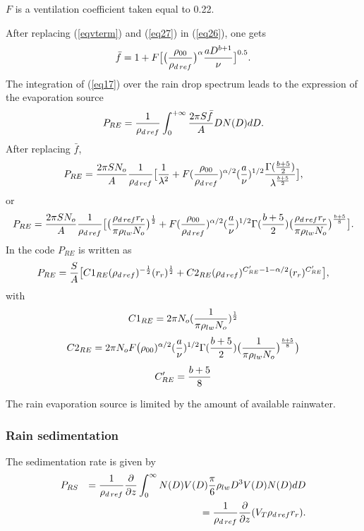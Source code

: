 $F$ is a ventilation coefficient taken equal to 0.22.

After replacing (\ref{eqvterm}) and (\ref{eq27}) in (\ref{eq26}), one gets
\begin{equation}
\bar f =  1 + F \big[ \big( {\rho_{00} \over \rho_{d\,ref}} \big) ^\alpha
{aD^{b+1}  \over \nu} \big] ^{0.5}.
\end{equation}
The integration of (\ref{eq17}) over the rain drop spectrum
leads to  the expression of the evaporation source
\begin{equation}
P_{RE} = {1 \over \rho_{d\,ref}}\int_0^{+\infty} {2 \pi S \bar f \over A} D N(D) dD.
\end{equation}
After replacing $\bar f$,
\begin{equation}
P_{RE} = {2 \pi S N_o \over A}{1 \over \rho_{d\,ref}} \big[ {1 \over \lambda ^2}
+ F ( {\rho_{00} \over \rho_{d\,ref}} )^{\alpha /2} ({a  \over \nu})^{1/2}
{\Gamma ({b+5 \over 2}) \over \lambda ^{{b+5 \over 2}}} \big],
\end{equation}
or
\begin{equation}
P_{RE} = {2 \pi S N_o \over A} {1 \over \rho_{d\,ref}} \big[
\big( {\rho_{d\,ref} r_r \over \pi \rho_{lw} N_o}\big) ^{1 \over 2}
+ F ( {\rho_{00} \over \rho_{d\,ref}} )^{\alpha /2} ({a  \over \nu})^{1/2}
\Gamma ({b+5 \over 2})
\big( {\rho_{d\,ref} r_r \over \pi \rho_{lw} N_o}\big) ^{b+5 \over 8} \big].
\end{equation}
In the code $P_{RE}$ is written as
\begin{equation}
P_{RE}= { S \over A}\big [ C1_{RE} (\rho_{d\,ref}) ^{-{1 \over 2}} (r_r) ^{1 \over 2} +
 C2_{RE} (\rho_{d\,ref} ) ^{C'_{RE}-1- \alpha/2} (r_r ) ^{C'_{RE}} \big],
\end{equation}
with
$$C1_{RE}=2 \pi  N_o ( {1 \over \pi \rho_{lw} N_o}) ^{1 \over 2}$$
$$C2_{RE}=2 \pi  N_o  F \big( \rho_{00} )^{\alpha /2} ({a \over \nu})^{1/2}
\Gamma ({b+5 \over 2})
\big( { 1 \over \pi \rho_{lw} N_o}\big) ^{b+5 \over 8} \big)$$
$$C'_{RE}={b+5 \over 8}$$

The rain evaporation source is limited by the amount of available rainwater.

\subsubsection{Rain sedimentation}
The sedimentation rate is given by
\begin{eqnarray}
&P_{RS} &= {1 \over \rho_{d\,ref}}{\partial \over \partial z} \int_0^\infty N(D)V(D) {\pi \over 6}
\rho_{lw} D^3 V(D)N(D) dD \\
&&= {1 \over \rho_{d\,ref}}{\partial \over \partial z} (V_T \rho_{d\,ref} r_r).
\end{eqnarray}

